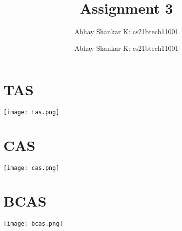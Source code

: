 \documentclass{amsart}
\author{Abhay Shankar K: cs21btech11001}
\newcommand{\me}{
    \author{Abhay Shankar K: cs21btech11001}
    \maketitle
}
\begin{document}
\title{Assignment 3}
\me

\section{TAS} 

\texttt{[image: tas.png]}

\section{CAS} 


\texttt{[image: cas.png]}

\section{BCAS} 

\texttt{[image: bcas.png]}
\end{document}
